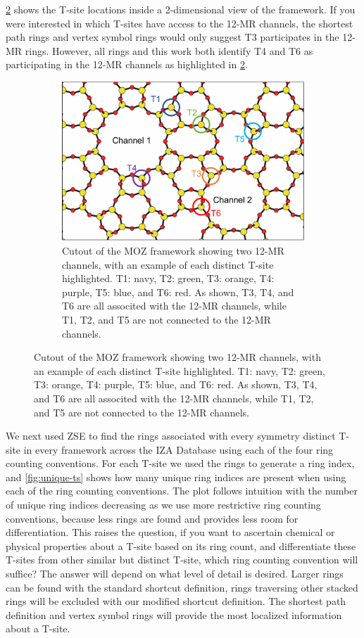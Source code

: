 \documentclass[preprint,numrefs,noinfo,sort&compress]{elsarticle}
\begin{document}
\cref{fig:moz} shows the T-site locations inside a 2-dimensional view of the framework. If you were interested in which T-sites have access to the 12-MR channels, the shortest path rings and vertex symbol rings would only suggest T3 participates in the 12-MR rings. However, all rings and this work both identify T4 and T6 as participating in the 12-MR channels as highlighted in \cref{fig:moz}. 

\begin{figure}
\begin{figure}[H]
\centering
\includegraphics[width=\textwidth]{figures/chapter-3/moz.pdf}
\caption{Cutout of the MOZ framework showing two 12-MR channels, with an example of each distinct T-site highlighted. T1: navy, T2: green, T3: orange, T4: purple, T5: blue, and T6: red. As shown, T3, T4, and T6 are all associted with the 12-MR channels, while T1, T2, and T5 are not connected to the 12-MR channels. \label{fig:moz}}
\end{figure}
\end{figure}

We next used ZSE to find the rings associated with every symmetry distinct T-site in every framework across the IZA Database using each of the four ring counting conventions. For each T-site we used the rings to generate a ring index, and \cref{fig:unique-ts} shows how many unique ring indices are present when using each of the ring counting conventions. The plot follows intuition with the number of unique ring indices decreasing as we use more restrictive ring counting conventions, because less rings are found and provides less room for differentiation. This raises the question, if you want to ascertain chemical or physical properties about a T-site based on its ring count, and differentiate these T-sites from other similar but distinct T-site, which ring counting convention will suffice? The answer will depend on what level of detail is desired. Larger rings can be found with the standard shortcut definition, rings traversing other stacked rings will be excluded with our modified shortcut definition. The shortest path definition and vertex symbol rings will provide the most localized information about a T-site. 
\end{document}
